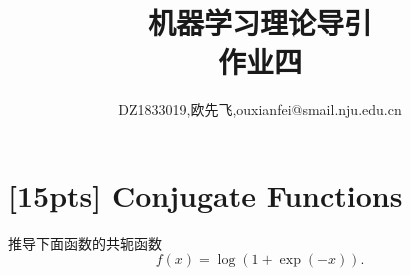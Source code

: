 \documentclass[a4paper,UTF8]{article}
\numberwithin{equation}{section}
\begin{document}
\renewcommand{\tilde}{\mathbf{w}idetilde}
\renewcommand{\hat}{\mathbf{w}idehat}
	\title{机器学习理论导引\\
		作业四}
	\author{DZ1833019,欧先飞,ouxianfei@smail.nju.edu.cn}
	\maketitle
	
	

\section{[15pts] Conjugate Functions}
\noindent 推导下面函数的共轭函数
\[
	f(x)=\log(1+\exp(-x)).
\]
	
\end{document}
